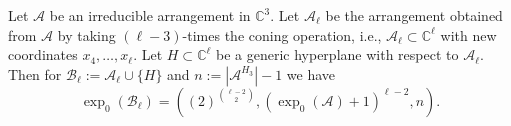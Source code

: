 \documentclass[10pt,a4paper]{amsart}
\def\A{{\mathcal{A}}}%
\def\B{{\mathcal{B}}}%
\def\CC{{\mathbb{C}}}%
\begin{document}
\begin{theorem}\label{thm:main_general}
	Let $\A$ be an irreducible arrangement in $\CC^3$. Let $\A_\ell$ be the arrangement obtained from $\A$ by taking $(\ell-3)$-times the coning operation, i.e., $\A_\ell \subset \CC^\ell$ with new coordinates $x_4,\ldots,x_\ell$.
	Let $H\subset \CC^\ell$ be a generic hyperplane with respect to $\A_\ell$.
	Then for $\B_\ell:=\A_\ell \cup \{H\}$ and $n:=|\A^{H_3}|-1$ we have
	$$
	\exp_0(\B_\ell)=((2)^{\binom{\ell-2}{2}},(\exp_0(\A)+ 1)^{\ell-2},n).
	$$

	\label{mainhigh}
\end{theorem}
\end{document}
